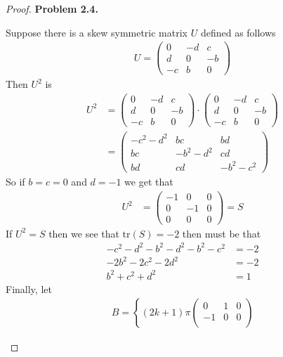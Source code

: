 \documentclass[11pt]{article}
\newcommand{\tr}{\text{tr}}
\theoremstyle{definition}
\begin{document}
\begin{proof}{\textbf{Problem 2.4.}}
\begin{itemize}
\begin{itemize}
    Suppose there is a skew symmetric matrix $U$ defined as follows
    \begin{align*}
        U = \begin{pmatrix}
            0 & -d & c\\
            d & 0 & -b\\
            -c & b & 0
        \end{pmatrix}
    \end{align*}
    Then $U^2$ is
    \begin{align*}
        U^2 &= \begin{pmatrix}
            0 & -d & c\\
            d & 0 & -b\\
            -c & b & 0
        \end{pmatrix}\cdot
        \begin{pmatrix}
            0 & -d & c\\
            d & 0 & -b\\
            -c & b & 0
        \end{pmatrix}\\
        &= \begin{pmatrix}
            -c^2-d^2 & bc & bd\\
            bc & -b^2-d^2 & cd\\
            bd & cd & -b^2 -c^2
        \end{pmatrix}
    \end{align*}
    So if $b = c = 0$ and $d = -1$ we get that
    \begin{align*}
        U^2 &= \begin{pmatrix}
            -1 & 0 & 0\\
            0 & -1 & 0\\
            0 & 0 & 0
        \end{pmatrix} = S
    \end{align*}
    If $U^2 = S$ then we see that $\tr(S) = -2$ then must be that
    \begin{align*}
        -c^2 - d^2 -b^2 - d^2 -b^2 - c^2 &= -2\\
        -2b^2 -2c^2 -2d^2  &= -2\\
        b^2 + c^2 + d^2  &= 1
    \end{align*}
\cleardoublepage
    Finally, let
    \begin{align*}
        B = \left\{(2k + 1)\pi\begin{pmatrix}
            0 & 1 & 0\\
            -1 & 0 & 0\\

\end{pmatrix}
\end{align*}
\end{itemize}
\end{itemize}
\end{proof}
\end{document}
